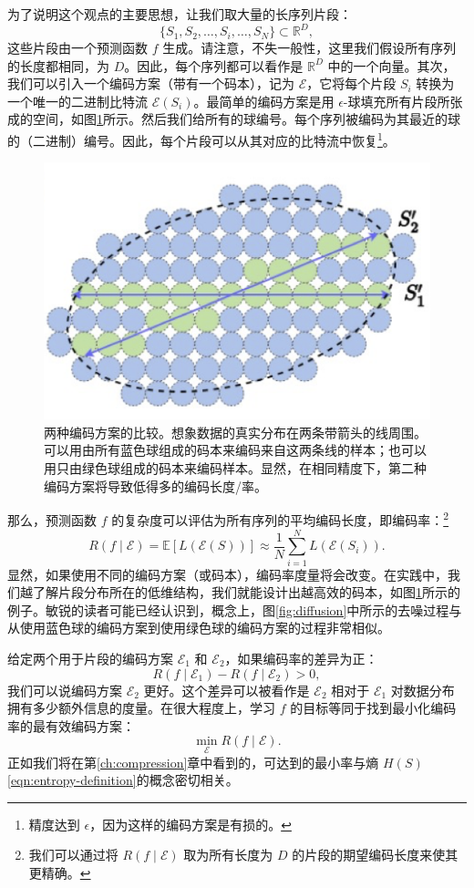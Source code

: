 \documentclass[../../book-main.tex]{subfiles}
\begin{document}
为了说明这个观点的主要思想，让我们取大量的长序列片段：
\begin{equation}
    \{S_1, S_2, \ldots, S_i, \ldots, S_N\} \subset \mathbb{R}^D,
\end{equation}
这些片段由一个预测函数 $f$ 生成。请注意，不失一般性，这里我们假设所有序列的长度都相同，为 $D$。因此，每个序列都可以看作是 $\mathbb{R}^D$ 中的一个向量。其次，我们可以引入一个编码方案（带有一个码本），记为 $\mathcal E$，它将每个片段 $S_i$ 转换为一个唯一的二进制比特流 $\mathcal{E}(S_i)$。最简单的编码方案是用 $\epsilon$-球填充所有片段所张成的空间，如图\ref{fig:coding-schemes}所示。然后我们给所有的球编号。每个序列被编码为其最近的球的（二进制）编号。因此，每个片段可以从其对应的比特流中恢复\footnote{精度达到 $\epsilon$，因为这样的编码方案是有损的。}。
\begin{figure}
    \centering
    \includegraphics[width=0.5\linewidth]{figures/Coding-schemes.png}
    \caption{两种编码方案的比较。想象数据的真实分布在两条带箭头的线周围。可以用由所有蓝色球组成的码本来编码来自这两条线的样本；也可以用只由绿色球组成的码本来编码样本。显然，在相同精度下，第二种编码方案将导致低得多的编码长度/率。}
    \label{fig:coding-schemes}
\end{figure}


那么，预测函数 $f$ 的复杂度可以评估为所有序列的平均编码长度，即编码率：\footnote{我们可以通过将 $R(f\mid \mathcal{E})$ 取为所有长度为 $D$ 的片段的期望编码长度来使其更精确。}
\begin{equation}
   R(f \mid \mathcal E) = \mathbb{E}[L(\mathcal{E}(S))] \approx \frac{1}{N}\sum_{i=1}^N L(\mathcal{E}(S_i)). 
   \label{eqn:coding-rate}
\end{equation}
显然，如果使用不同的编码方案（或码本），编码率度量将会改变。在实践中，我们越了解片段分布所在的低维结构，我们就能设计出越高效的码本，如图\ref{fig:coding-schemes}所示的例子。敏锐的读者可能已经认识到，概念上，图\ref{fig:diffusion}中所示的去噪过程与从使用蓝色球的编码方案到使用绿色球的编码方案的过程非常相似。


给定两个用于片段的编码方案 $\mathcal{E}_1$ 和 $\mathcal{E}_2$，如果编码率的差异为正：
\begin{equation}
   R(f \mid \mathcal E_1) -  R(f \mid \mathcal E_2) > 0, 
\end{equation}
我们可以说编码方案 $\mathcal{E}_2$ 更好。这个差异可以被看作是 $\mathcal{E}_2$ 相对于 $\mathcal{E}_1$ 对数据分布拥有多少额外信息的度量。在很大程度上，学习 $f$ 的目标等同于找到最小化编码率的最有效编码方案：
\begin{equation}
   \min_{\mathcal{E}} R(f \mid \mathcal E). 
\end{equation}
正如我们将在第\ref{ch:compression}章中看到的，可达到的最小率与熵 $H(S)$ \eqref{eqn:entropy-definition}的概念密切相关。
\end{document}
